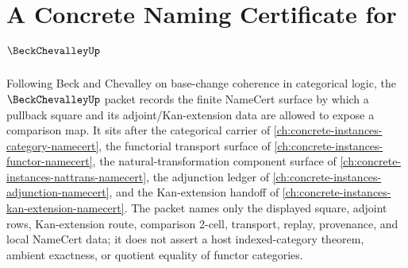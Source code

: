 \chapter{A Concrete Naming Certificate for $\BeckChevalleyUp$}
\label{ch:concrete-instances-beck-chevalley-namecert}

Following Beck and Chevalley on base-change coherence in categorical logic, the $\BeckChevalleyUp$ packet records the finite NameCert surface by which a pullback square and its adjoint/Kan-extension data are allowed to expose a comparison map. It sits after the categorical carrier of \autoref{ch:concrete-instances-category-namecert}, the functorial transport surface of \autoref{ch:concrete-instances-functor-namecert}, the natural-transformation component surface of \autoref{ch:concrete-instances-nattrans-namecert}, the adjunction ledger of \autoref{ch:concrete-instances-adjunction-namecert}, and the Kan-extension handoff of \autoref{ch:concrete-instances-kan-extension-namecert}. The packet names only the displayed square, adjoint rows, Kan-extension route, comparison 2-cell, transport, replay, provenance, and local NameCert data; it does not assert a host indexed-category theorem, ambient exactness, or quotient equality of functor categories.

